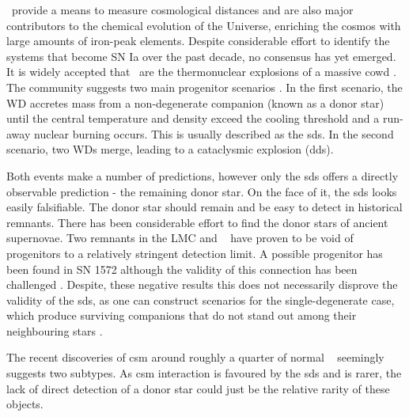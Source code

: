 \documentclass[preprint2]{aastex}
\begin{document}
\sneia\ provide a means to measure cosmological distances and are also major contributors to the chemical evolution of the Universe, enriching the cosmos with large amounts of iron-peak elements. Despite considerable effort to identify the systems that become SN Ia over the past decade, no consensus has yet emerged. It is widely accepted that \sneia\ are the thermonuclear explosions of a massive \gls{cowd} . The community suggests two main progenitor scenarios \cite[for a review see][and references therein]{2012NewAR..56..122W}. In the first scenario, the WD accretes mass from a non-degenerate companion (known as a donor star) until the central temperature and density exceed the cooling threshold and a run-away nuclear burning occurs. This is usually described as the \gls{sds}. In the second scenario, two WDs merge, leading to a cataclysmic explosion (\gls{dds}).

Both events make a number of predictions, however only the \gls{sds} offers a directly observable prediction - the remaining donor star. On the face of it, the \gls{sds} looks easily falsifiable. The donor star should remain \citep[e.g.][]{2000ApJS..128..615M} and be easy to detect in historical remnants. There has been considerable effort \citep{2004Natur.431.1069R, 2009ApJ...691....1G,2009ApJ...701.1665K,2012Natur.481..164S,2012Natur.489..533G,2012arXiv1210.2713K,2012ApJ...759....7K, 2012ApJ...747L..19E} to find the donor stars of ancient supernovae. Two remnants in the LMC \citep{2012ApJ...747L..19E, 2012Natur.481..164S} and \ \citep{2012ApJ...759....7K, 2012Natur.489..533G} have proven to be void of progenitors to a relatively stringent detection limit. A possible progenitor has been found in SN 1572 \citep{2004Natur.431.1069R} although the validity of this connection has been challenged \citep{2012arXiv1210.2713K}. Despite, these negative results this does not necessarily disprove the validity of the \gls{sds}, as one can construct scenarios for the single-degenerate case, which produce surviving companions that do not stand out among their neighbouring stars \citep[e.g.][]{2012ApJ...760...21P, 2013arXiv1303.2691L, 2003astro.ph..3660P}. 

The recent discoveries of \gls{csm} around roughly a quarter of normal \sneia\ \citep{2007Sci...317..924P, 2009ApJ...702.1157S, 2011Sci...333..856S, 2012ApJ...752..101F} seemingly suggests two subtypes. As \gls{csm} interaction is favoured by the \gls{sds} and is rarer, the lack of direct detection of a donor star could just be the relative rarity of these objects.
\end{document}
